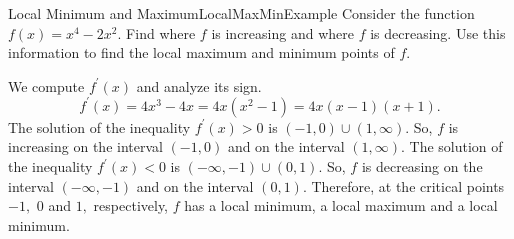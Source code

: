 \begin{example}{Local Minimum and Maximum}{LocalMaxMinExample}
Consider the function $f\left( x\right) =x^{4}-2x^{2}.$ Find
where $f$ is increasing and where $f$ is decreasing. Use this information to
find the local maximum and minimum points of $f$.
\end{example}
\begin{solution}
We compute $f^{\prime }\left( x\right) $ and analyze its sign. 
\begin{equation*}
f^{\prime }\left( x\right) =4x^{3}-4x=4x\left( x^{2}-1\right) =4x\left(
x-1\right) \left( x+1\right) .
\end{equation*}%
The solution of the inequality $f^{\prime }\left( x\right) >0$ is $\left(
-1,0\right) \cup \left( 1,\infty \right) $. So, $f$ is increasing on the
interval $\left( -1,0\right) $ and on the interval $\left( 1,\infty \right)
. $ The solution of the inequality $f^{\prime }\left( x\right) <0$ is $%
\left( -\infty ,-1\right) \cup \left( 0,1\right) .$ So, $f$ is decreasing on
the interval $\left( -\infty ,-1\right) $ and on the interval $\left(
0,1\right) .$ Therefore, at the critical points $-1,$ $0$ and $1,$
respectively, $f$ has a local minimum, a local maximum and a local minimum.
\end{solution}

